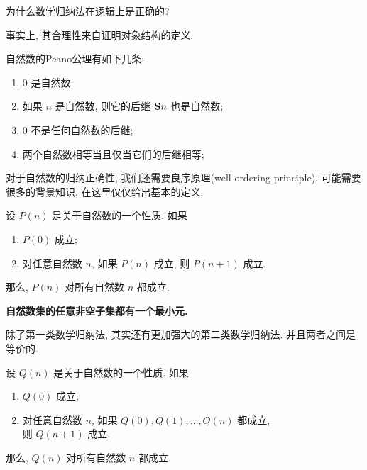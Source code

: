 \begin{bonus}
	为什么数学归纳法在逻辑上是正确的? 
\end{bonus}

事实上, 其合理性来自证明对象结构的定义. 

\begin{definition}[Peano 公理]
    自然数的Peano公理有如下几条: 
    \begin{enumerate}
      \item 0 是自然数;
      \item 如果 $n$ 是自然数, 则它的后继 ${\bf S}n$ 也是自然数;
      \item 0 不是任何自然数的后继;
      \item 两个自然数相等当且仅当它们的后继相等;
    \end{enumerate}
\end{definition}


对于自然数的归纳正确性, 我们还需要良序原理(well-ordering principle). 可能需要很多的背景知识, 在这里仅仅给出基本的定义. 

\begin{theorem}
    设 $P(n)$ 是关于自然数的一个性质. 
    如果
    \begin{enumerate}
      \item $P(0)$ 成立;
      \item 对任意自然数 $n$, 如果 $P(n)$ 成立, 则 $P(n+1)$ 成立. 
    \end{enumerate}
    那么, $P(n)$ 对所有自然数 $n$ 都成立. 
\end{theorem}

\begin{definition}
    \bf{自然数集}的任意\bf{非空}子集都有一个最小元. 
\end{definition}

除了第一类数学归纳法, 其实还有更加强大的第二类数学归纳法. 并且两者之间是等价的. 

\begin{theorem}
    设 $Q(n)$ 是关于自然数的一个性质. 
    如果
    \begin{enumerate}
      \item $Q(0)$ 成立;
      \item 对任意自然数 $n$, 如果 $Q(0), Q(1), \dots, Q(n)$ 都成立, \\ 则 $Q(n+1)$ 成立. 
    \end{enumerate}
    那么, $Q(n)$ 对所有自然数 $n$ 都成立. 
  \end{theorem}
  
